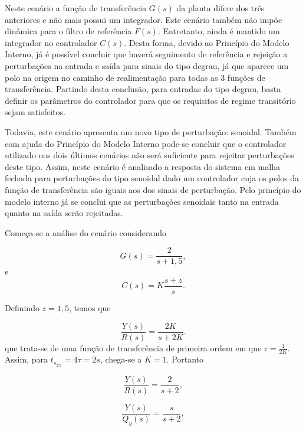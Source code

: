 Neste cenário a função de transferência $G(s)$ da planta difere dos três
anteriores e não mais possui um integrador. Este cenário também não impõe
dinâmica para o filtro de referência $F(s)$. Entretanto, ainda é mantido um
integrador no controlador $C(s)$. Desta forma, devido ao Princípio do Modelo
Interno, já é possível concluir que haverá seguimento de referência e rejeição a
perturbações na entrada e saída para sinais do tipo degrau, já que aparece um
polo na origem no caminho de realimentação para todas as 3 funções de
transferência. Partindo desta conclusão, para entradas do tipo degrau, basta
definir os parâmetros do controlador para que os requisitos de regime
transitório sejam satisfeitos.

Todavia, este cenário apresenta um novo tipo de perturbação: senoidal. Também
com ajuda do Princípio do Modelo Interno pode-se concluir que o controlador
utilizado nos dois últimos cenários não será suficiente para rejeitar
perturbações deste tipo. Assim, neste cenário é analisado a resposta do sistema
em malha fechada para perturbações do tipo senoidal dado um controlador cuja os
polos da função de transferência são iguais aos dos sinais de perturbação. Pelo
princípio do modelo interno já se conclui que as perturbações senoidais tanto na
entrada quanto na saída serão rejeitadas.

Começa-se a análise do cenário considerando

\begin{equation}
    \label{eq:gdes-cenario4}
    G(s) = \frac{2}{s + 1,5}, 
\end{equation}
e
\begin{equation}
    \label{eq:cdes-cenario4}
    C(s) = K\frac{s + z}{s}.
\end{equation}

Definindo $z = 1,5$, temos que

\begin{equation}
    \label{eq:y2r-comk-cenario4}
    \frac{Y(s)}{R(s)} = \frac{2K}{s + 2K}.
\end{equation}
que trata-se de uma função de transferência de primeira ordem em que $\tau =
\frac{1}{2K}$. Assim, para $t_{s_{2\%}} = 4\tau = 2s$, chega-se a $K = 1$.
Portanto

\begin{equation}
    \label{eq:y2r-solucionado-cenario4-a-b}
    \frac{Y(s)}{R(s)} = \frac{2}{s + 2},
\end{equation}

\begin{equation}
    \label{eq:y2qy-solucionado-cenario4-a-b}
    \frac{Y(s)}{Q_{y}(s)} = \frac{s}{s + 2},
\end{equation}

